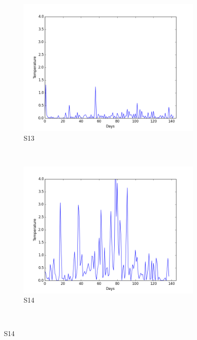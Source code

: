\documentclass[12pt]{article} %
\begin{document}
\begin{figure}[H]
    \begin{subfigure}[b]{0.30\textwidth}
        \includegraphics[width=\textwidth]{img/graphs/13-gsr-1}
        \caption{S13}
        \label{fig:s13GSR}
    \end{subfigure}
    ~ %
    \begin{subfigure}[b]{0.30\textwidth}
        \includegraphics[width=\textwidth]{img/graphs/14-gsr-1}
        \caption{S14}
        \label{fig:s14GSR}
    \end{subfigure}
    ~ %

\end{figure}
\end{document}
